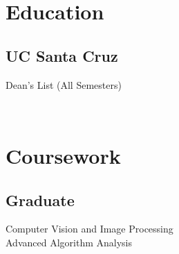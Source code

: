 \documentclass[letterpaper]{deedy-resume} %
\begin{document}




\begin{minipage}[t]{0.30\textwidth} %


\section{Education} 

\subsection{UC Santa Cruz }

Dean's List (All Semesters) \\

\sectionspace %


\

\section{Coursework}

\subsection{Graduate}

Computer Vision and Image Processing \\
Advanced Algorithm Analysis \\\

\end{minipage}
\end{document}
